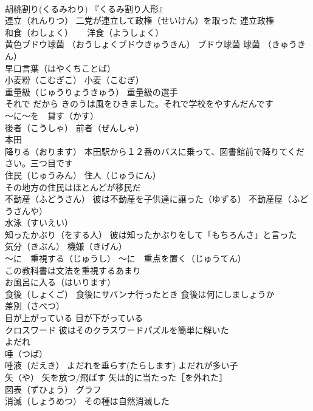\documentclass[8pt]{extreport}
\begin{document}
\begin{CJK}{UTF8}{min}
\\	胡桃割り(くるみわり) 『くるみ割り人形』
\\	連立（れんりつ） 二党が連立して政権（せいけん）を取った 連立政権
\\	和食（わしょく） 　 洋食（ようしょく）
\\	黄色ブドウ球菌 （おうしょくブドウきゅうきん） ブドウ球菌 球菌 （きゅうきん）
\\	早口言葉（はやくちことば）
\\	小麦粉（こむぎこ） 小麦（こむぎ）
\\	重量級（じゅうりょうきゅう） 重量級の選手
\\	それで だから きのうは風をひきました。それで学校をやすんだんです
\\	～に～を　貸す（かす）
\\	後者（こうしゃ） 前者（ぜんしゃ）
\\	本田 
\\	降りる（おります） 本田駅から１２番のバスに乗って、図書館前で降りてください。三つ目です
\\	住民（じゅうみん） 住人（じゅうにん）
\\	その地方の住民はほとんどが移民だ
\\	不動産（ふどうさん） 彼は不動産を子供達に譲った（ゆずる） 不動産屋（ふどうさんや）
\\	水泳（すいえい）
\\	知ったかぶり（をする人） 彼は知ったかぶりをして「もちろんさ」と言った
\\	気分（きぶん） 機嫌（きげん）
\\	～に　重視する（じゅうし） ～に　重点を置く（じゅうてん）
\\	この教科書は文法を重視するあまり
\\	お風呂に入る（はいります）
\\	食後（しょくご） 食後にサバンナ行ったとき 食後は何にしましょうか
\\	差別（さべつ）
\\	目が上がっている 目が下がっている
\\	クロスワード 彼はそのクラスワードパズルを簡単に解いた
\\	よだれ 
\\	唾（つば）
\\	唾液（だえき） よだれを垂らす(たらします) よだれが多い子
\\	矢（や） 矢を放つ/飛ばす 矢は的に当たった［を外れた］
\\	図表（ずひょう） グラフ
\\	消滅（しょうめつ） その種は自然消滅した

\end{CJK}
\end{document}
